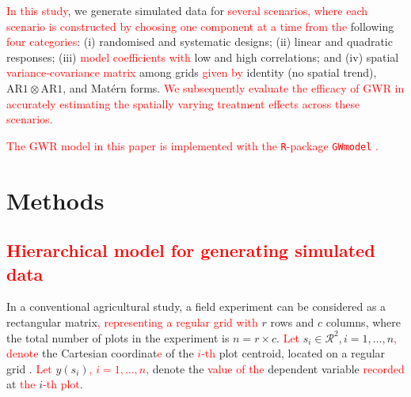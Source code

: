 \documentclass[a4paper]{article} 	%
\newcommand{\R}{\texttt{R}}
\newcommand{\Matern}{Mat\'ern }
\newcommand{\AR}{\mathrm{AR1}}
\newcommand{\revision}[1]{\textcolor{red}{#1}}
\newcommand{\zc}[1]{\textcolor{red}{#1}}
\begin{document}
\revision{In this study}, we generate simulated data for \revision{several scenarios, where each scenario is constructed by choosing one component at a time from the} following \revision{four categories}: (i) randomised and systematic designs; (ii) linear and quadratic responses; (iii) \revision{model coefficients with} low and high correlations; and (iv) spatial \revision{variance-covariance matrix} among grids \revision{given by} identity (no spatial trend), $\AR\otimes\AR$, and \Matern forms. \zc{We subsequently evaluate the efficacy of GWR in accurately estimating the spatially varying treatment effects across these scenarios.}

\revision{The GWR model in this paper is implemented with the \R-package \texttt{GWmodel} \parencite{lu2014gwmodel, Gollini2015GWmodel}.}

\section{Methods}\label{Sec:Meth}




\subsection{\revision{Hierarchical model for generating simulated data}}\label{sec:basic}

In a conventional agricultural study, a field experiment can be considered as a rectangular matrix\revision{, representing a regular grid with} $r$ rows and $c$ columns, where the total number of plots in the experiment is $n=r\times c$. \revision{Let} $s_i\in \mathcal{R}^2, i=1,\ldots,n$\revision{,} \revision{denote} the Cartesian coordinat\revision{e} of the \revision{$i$-th} plot centroid, located on a regular grid \parencite{Zimmerman1991Randoma}. \revision{Let} $y(s_i)$\revision{, $i=1,\ldots,n$,} denote the \revision{value of the} dependent variable \revision{recorded} at \revision{the} $i$\revision{-th plot}. 
	
\end{document}

